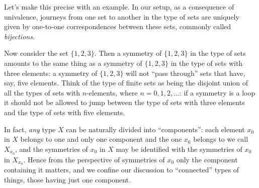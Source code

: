 Let's make this precise with an example.
In our setup,
as a consequence of univalence, journeys from one set to another
in the type of sets are
uniquely given by one-to-one correspondences between these sets,
commonly called \emph{bijections}.

Now consider the set $\{1,2,3\}$. Then a symmetry of $\{1,2,3\}$ in the type of  sets amounts to the same thing as a symmetry of $\{1,2,3\}$ in the type of sets with three elements: a symmetry of $\{1,2,3\}$ will not ``pass through'' sets that have, say, five elements. Think of the type of finite sets as being the disjoint union of all the types of sets with $n$-elements, where $n=0,1,2,\dots$: if a symmetry is a loop it should not be allowed to jump between the type of sets with three elements and the type of sets with five elements.

In fact, \emph{any} type $X$ can be naturally divided into ``components'': each element $x_0$ in $X$ belongs to one and only one component and the one $x_0$ belongs to we call $X_{x_0}$, and the symmetries of $x_0$ in $X$ may be identified with the symmetries of $x_0$ in $X_{x_0}$. Hence from the perspective of symmetries of $x_0$ only the component containing it matters, and we confine our discussion to ``connected'' types of things, \ie those having just one component.

